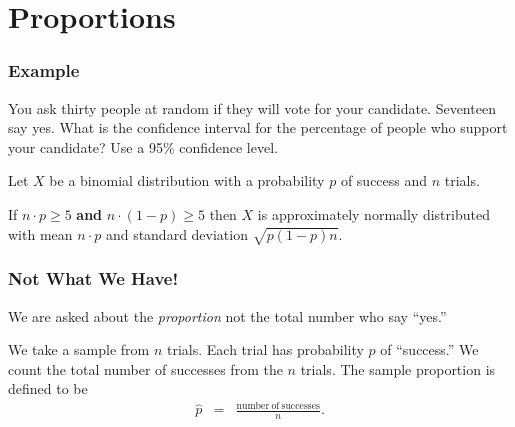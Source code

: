 \section{Proportions}

\begin{frame}
  \frametitle{Example}

  You ask thirty people at random if they will vote for your
  candidate. Seventeen say yes. What is the confidence interval for
  the percentage of people who support your candidate? Use a 95\%
  confidence level.

  \vfill

  {
    Let $X$ be a binomial distribution with a probability $p$ of
    success and $n$ trials.
  }

  \vfill

  {
    If $n\cdot p \geq 5$ \textbf{and} $n\cdot (1-p) \geq 5$ then $X$
    is approximately normally distributed with mean $n\cdot p$ and
    standard deviation $\sqrt{p(1-p)n}$.
  }

\end{frame}


\begin{frame}
  \frametitle{Not What We Have!}

  We are asked about the \textit{proportion} not the total number who
  say ``yes.''

  \vfill

  \begin{definition}

    We take a sample from $n$ trials. Each trial has probability $p$
    of ``success.'' We count the total number of successes from the
    $n$ trials.  The sample proportion is defined to be
    \begin{eqnarray*}
      \hat{p} & = & \frac{\mathrm{number~of~successes}}{n}.
    \end{eqnarray*}
    
  \end{definition}



\end{frame}

